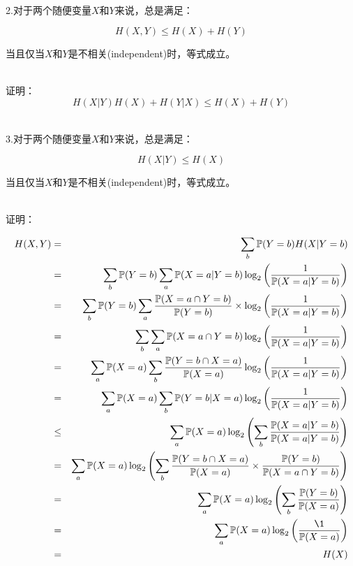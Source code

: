 \documentclass{article}
\begin{document}
~\\

2.对于两个随便变量$X$和$Y$来说，总是满足：

$$H(X,Y) \leq H(X) + H(Y)$$

当且仅当$X$和$Y$是不相关(independent)时，等式成立。

~\\

证明：
$$H(X|Y) H(X) + H(Y|X )\leq H(X) + H(Y)$$


~\\

3.对于两个随便变量$X$和$Y$来说，总是满足：

$$H(X|Y) \leq H(X)$$

当且仅当$X$和$Y$是不相关(independent)时，等式成立。

~\\

证明：


\begin{eqnarray}   
\label{eq}
H(X,Y)&=& \sum_b \mathbb{P}(Y=b)H(X|Y=b)\nonumber \\ 
&=&\sum_b \mathbb{P}(Y=b) \sum_a \mathbb{P}(X=a|Y=b) \log_2 \left( \frac{1}{\mathbb{P}(X=a|Y=b)} \right)  \nonumber \\  
&=&  \sum_b \mathbb{P}(Y=b) \sum_a \frac{\mathbb{P}(X=a \cap Y=b)}{\mathbb{P}(Y=b)} \times \log_2 \left( \frac{1}{\mathbb{P}(X=a|Y=b)} \right) \nonumber \\  
&=& \sum_b \sum_a \mathbb{P}(X=a \cap Y=b) \log_2 \left( \frac{1}{\mathbb{P}(X=a|Y=b)} \right)\nonumber \\  
&=& \sum_a \mathbb{P}(X=a) \sum_b \frac{\mathbb{P}(Y=b \cap X=a )}{\mathbb{P}(X=a)}  \log_2 \left( \frac{1}{\mathbb{P}(X=a|Y=b)} \right)\nonumber \\  
&=& \sum_a \mathbb{P}(X=a) \sum_b\mathbb{P}( Y=b|X=a )  \log_2 \left( \frac{1}{\mathbb{P}(X=a|Y=b)} \right)\nonumber \\  
&\leq&  \sum_a \mathbb{P}(X=a) \log_2 \left(  \sum_b \frac{\mathbb{P}(X=a|Y=b)} {\mathbb{P}(X=a|Y=b)} \right)\nonumber \\  
&=&\sum_a \mathbb{P}(X=a) \log_2 \left(  \sum_b \frac{\mathbb{P}(Y=b \cap X=a)} {\mathbb{P}(X=a)} \times \frac{\mathbb{P}(Y=b)} {\mathbb{P}(X=a \cap Y=b)} \right)\nonumber \\
&=& \sum_a \mathbb{P}(X=a) \log_2 \left(  \sum_b \frac{\mathbb{P}(Y=b)} {\mathbb{P}(X=a)} \right)\nonumber \\
&=& \sum_a \mathbb{P}(X=a) \log_2 \left( \frac{\1} {\mathbb{P}(X=a)} \right) \nonumber \\
&=& H(X)\nonumber \\
\nonumber 
\end{eqnarray}
\end{document}
